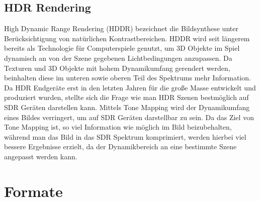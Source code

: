 \documentclass[11pt, a4paper, twocolumn]{article}
\begin{document}
	\subsection{HDR Rendering}
	High Dynamic Range Rendering (HDDR) bezeichnet die Bildsynthese unter Berücksichtigung von natürlichen Kontrastbereichen. HDDR wird seit längerem bereits als Technologie für Computerspiele genutzt, um 3D Objekte im Spiel dynamisch an von der Szene gegebenen Lichtbedingungen anzupassen. Da Texturen und 3D Objekte mit hohem Dynamikumfang gerendert werden, beinhalten diese im unteren sowie oberen Teil des Spektrums mehr Information. Da HDR Endgeräte erst in den letzten Jahren für die große Masse entwickelt und produziert wurden, stellte sich die Frage wie man HDR Szenen bestmöglich auf SDR Geräten darstellen kann. Mittels Tone Mapping wird der Dynamikumfang eines Bildes verringert, um auf SDR Geräten darstellbar zu sein. Da das Ziel von Tone Mapping ist, so viel Information wie möglich im Bild beizubehalten, während man das Bild in das SDR Spektrum komprimiert, werden hierbei viel bessere Ergebnisse erzielt, da der Dynamikbereich an eine bestimmte Szene angepasst werden kann.
	\section{Formate}
\end{document}
